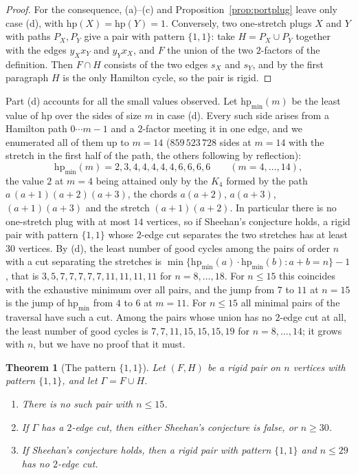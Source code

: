 \documentclass[11pt,a4paper]{article}
\newtheorem{theorem}{Theorem}[section]
\theoremstyle{definition}
\theoremstyle{remark}
\begin{document}
\begin{proof}
For the consequence, (a)--(c) and Proposition~\ref{prop:portplug} leave only case (d), with $\mathrm{hp}(X)=\mathrm{hp}(Y)=1$. Conversely, two one-stretch plugs $X$ and $Y$ with paths $P_X,P_Y$ give a pair with pattern $\{1,1\}$: take $H=P_X\cup P_Y$ together with the edges $y_Xx_Y$ and $y_Yx_X$, and $F$ the union of the two $2$-factors of the definition. Then $F\cap H$ consists of the two edges $s_X$ and $s_Y$, and by the first paragraph $H$ is the only Hamilton cycle, so the pair is rigid.
\end{proof}

Part (d) accounts for all the small values observed. Let $\mathrm{hp}_{\min}(m)$ be the least value of $\mathrm{hp}$ over the sides of size $m$ in case (d). Every such side arises from a Hamilton path $0\cdots m-1$ and a $2$-factor meeting it in one edge, and we enumerated all of them up to $m=14$ ($859\,523\,728$ sides at $m=14$ with the stretch in the first half of the path, the others following by reflection):
\[
\mathrm{hp}_{\min}(m)=2,3,4,4,4,4,4,6,6,6,6\qquad(m=4,\dots,14),
\]
the value $2$ at $m=4$ being attained only by the $K_4$ formed by the path $a\,(a+1)(a+2)(a+3)$, the chords $a(a+2)$, $a(a+3)$, $(a+1)(a+3)$ and the stretch $(a+1)(a+2)$. In particular there is no one-stretch plug with at most $14$ vertices, so if Sheehan's conjecture holds, a rigid pair with pattern $\{1,1\}$ whose $2$-edge cut separates the two stretches has at least $30$ vertices. By (d), the least number of good cycles among the pairs of order $n$ with a cut separating the stretches is $\min\{\mathrm{hp}_{\min}(a)\cdot\mathrm{hp}_{\min}(b):a+b=n\}-1$, that is $3,5,7,7,7,7,7,11,11,11,11$ for $n=8,\dots,18$. For $n\le15$ this coincides with the exhaustive minimum over all pairs, and the jump from $7$ to $11$ at $n=15$ is the jump of $\mathrm{hp}_{\min}$ from $4$ to $6$ at $m=11$. For $n\le15$ all minimal pairs of the traversal have such a cut. Among the pairs whose union has no $2$-edge cut at all, the least number of good cycles is $7,7,11,15,15,15,19$ for $n=8,\dots,14$; it grows with $n$, but we have no proof that it must.

\begin{theorem}[The pattern $\{1,1\}$]\label{thm:pattern11}
Let $(F,H)$ be a rigid pair on $n$ vertices with pattern $\{1,1\}$, and let $\Gamma=F\cup H$.
\begin{enumerate}
\item[(a)] There is no such pair with $n\le15$.
\item[(b)] If $\Gamma$ has a $2$-edge cut, then either Sheehan's conjecture is false, or $n\ge30$.
\item[(c)] If Sheehan's conjecture holds, then a rigid pair with pattern $\{1,1\}$ and $n\le29$ has no $2$-edge cut.
\end{enumerate}
\end{theorem}
\end{document}
